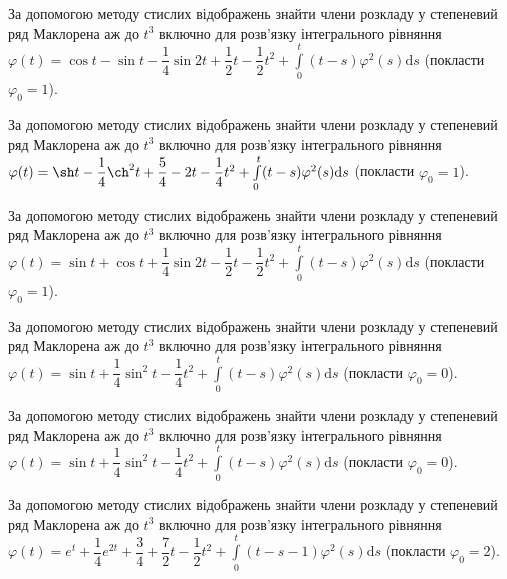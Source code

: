 \documentclass[12pt]{extarticle}
\begin{document}
\begin{Exercise}
За допомогою методу стислих відображень знайти члени розкладу у степеневий ряд Маклорена аж до $t^3$ включно для розв’язку інтегрального рівняння $\varphi (t) = \cos t - \sin t - \dfrac{1}{4} \sin 2t + \dfrac{1}{2} t - \dfrac{1}{2} t^2 + \int\limits_{0}^{t} (t-s) \varphi^2(s) \mathrm{d}s$ (покласти $\varphi_0 = 1$).
\end{Exercise}

\begin{Exercise}
За допомогою методу стислих відображень знайти члени розкладу у степеневий ряд Маклорена аж до $t^3$ включно для розв’язку інтегрального рівняння $\varphi (t) = \sh t - \dfrac{1}{4} \ch^2 t + \dfrac{5}{4} - 2 t - \dfrac{1}{4} t^2 + \int\limits_{0}^{t} (t - s) \varphi^2(s) \mathrm{d}s$ (покласти $\varphi_0 = 1$).
\end{Exercise}

\begin{Exercise}
За допомогою методу стислих відображень знайти члени розкладу у степеневий ряд Маклорена аж до $t^3$ включно для розв’язку інтегрального рівняння $\varphi (t) = \sin t + \cos t + \dfrac{1}{4} \sin 2t -\dfrac{1}{2} t - \dfrac{1}{2} t^2 + \int\limits_{0}^{t} (t-s) \varphi^2(s) \mathrm{d}s$ (покласти $\varphi_0 = 1$).
\end{Exercise}

\begin{Exercise}
За допомогою методу стислих відображень знайти члени розкладу у степеневий ряд Маклорена аж до $t^3$ включно для розв’язку інтегрального рівняння $\varphi (t) = \sin t + \dfrac{1}{4} \sin^2 t - \dfrac{1}{4} t^2 + \int\limits_{0}^{t} (t-s) \varphi^2(s) \mathrm{d}s$ (покласти $\varphi_0 = 0$).
\end{Exercise}

\begin{Exercise}
За допомогою методу стислих відображень знайти члени розкладу у степеневий ряд Маклорена аж до $t^3$ включно для розв’язку інтегрального рівняння $\varphi (t) = \sin t + \dfrac{1}{4} \sin^2 t - \dfrac{1}{4} t^2 + \int\limits_{0}^{t} (t-s)\varphi^2(s) \mathrm{d}s$ (покласти $\varphi_0 = 0$).
\end{Exercise}

\begin{Exercise}
За допомогою методу стислих відображень знайти члени розкладу у степеневий ряд Маклорена аж до $t^3$ включно для розв’язку інтегрального рівняння $\varphi (t) = e^t + \dfrac{1}{4} e^{2t} + \dfrac{3}{4} + \dfrac{7}{2} t - \dfrac{1}{2} t^2 + \int\limits_{0}^{t} (t-s-1)\varphi^2(s) \mathrm{d}s$ (покласти $\varphi_0 = 2$).
\end{Exercise}
\end{document}
